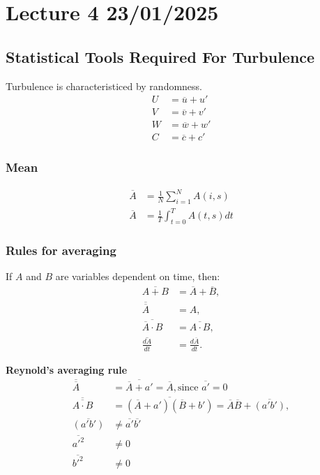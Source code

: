 \documentclass[fleqn,10pt]{SelfArx} %
\begin{document}
\clearpage

\section{Lecture 4 23/01/2025}
\subsection{Statistical Tools Required For Turbulence}

Turbulence is characteristiced by randomness.
\begin{align*}
	U & = \overline{u} + u' \\
	V & = \overline{v} + v' \\
	W & = \overline{w} + w' \\
	C & = \overline{c} + c'
\end{align*}

\subsubsection{Mean}
\begin{align*}
	\overline{A} & = \frac{1}{N}\sum^N_{i=1}A(i,s)   \\
	\overline{A} & = \frac{1}{T}\int^T_{t=0}A(t,s)dt
\end{align*}

\subsubsection{Rules for averaging}
If $A$ and $B$ are variables dependent on time, then:
\begin{align*}
	\overline{A + B}                & = \overline{A} + \overline{B}, \\
	\overline{\overline{A}}         & = A,                           \\
	\overline{\overline{A} \cdot B} & = \overline{A \cdot B},        \\
	\overline{\frac{dA}{dt}}        & = \frac{d\overline{A}}{dt}.
\end{align*}

\textbf{Reynold's averaging rule}
\begin{align*}
	\overline{\overline{A}}         & = \overline{\overline{A}+a'} = \overline{A}, \text{since } \overline{a'}=0                      \\
	\overline{\overline{A \cdot B}} & = \overline{(\overline{A}+a')(\overline{B}+b')} = \overline{A}\overline{B} + \overline{(a'b')}, \\
	\overline{(a'b')}               & \neq  \overline{a'}\overline{b'}                                                                \\
	\overline{a'^2}                 & \neq 0                                                                                          \\
	\overline{b'^2}                 & \neq 0
\end{align*}
\end{document}
